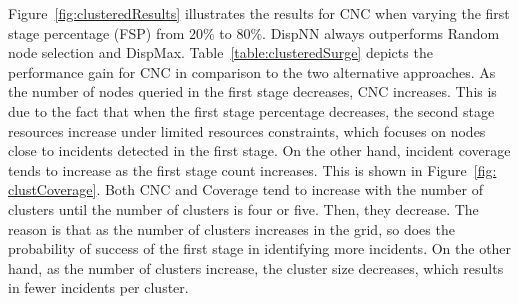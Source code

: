 \documentclass{acm_proc_article-sp}
\begin{document}
Figure~\ref{fig:clusteredResults} illustrates the results for CNC when varying the first stage percentage (FSP) from $20\%$ to $80\%$. DispNN always outperforms Random node selection and DispMax. Table~\ref{table:clusteredSurge} depicts the performance gain for CNC in comparison to the two alternative approaches. As the number of nodes queried in the first stage decreases, CNC increases. This is due to the fact that when the first stage percentage decreases, the second stage resources increase under limited resources constraints, which focuses on nodes close to incidents detected in the first stage. On the other hand, incident coverage tends to increase as the first stage count increases. This is shown in Figure~\ref{fig: clustCoverage}. Both CNC and Coverage tend to increase with the number of clusters until the number of clusters is four or five. Then, they decrease. The reason is that as the number of clusters increases in the grid, so does the probability of success of the first stage in identifying more incidents. On the other hand, as the number of clusters increase, the cluster size decreases, which results in fewer incidents per cluster.

\end{document}
